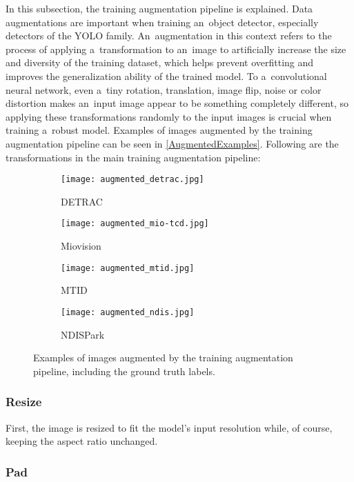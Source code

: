 In this subsection, the training augmentation pipeline is explained. Data
augmentations are important when training an~object detector, especially
detectors of the YOLO family. An~augmentation in this context refers to the
process of applying a~transformation to an~image to artificially increase the
size and diversity of the training dataset, which helps prevent overfitting and
improves the generalization ability of the trained model. To a~convolutional
neural network, even a~tiny rotation, translation, image flip, noise or color
distortion makes an~input image appear to be something completely different, so
applying these transformations randomly to the input images is crucial when
training a~robust model. Examples of images augmented by the training
augmentation pipeline can be seen in \autoref{AugmentedExamples}. Following are
the transformations in the main training augmentation pipeline:

\begin{figure}[t]
    \centering
    \begin{subfigure}[b]{0.49\textwidth}
        \texttt{[image: augmented\_detrac.jpg]}
        \caption{DETRAC}
    \end{subfigure}
    \begin{subfigure}[b]{0.49\textwidth}
        \texttt{[image: augmented\_mio-tcd.jpg]}
        \caption{Miovision}
    \end{subfigure}
    \begin{subfigure}[b]{0.49\textwidth}
        \texttt{[image: augmented\_mtid.jpg]}
        \caption{MTID}
    \end{subfigure}
    \begin{subfigure}[b]{0.49\textwidth}
        \texttt{[image: augmented\_ndis.jpg]}
        \caption{NDISPark}
    \end{subfigure}
    \caption{Examples of images augmented by the training augmentation pipeline,
    including the ground truth labels.}
    \label{AugmentedExamples}
\end{figure}


\subsubsection*{Resize}

First, the image is resized to fit the model's input resolution while, of
course, keeping the aspect ratio unchanged.


\subsubsection*{Pad}

